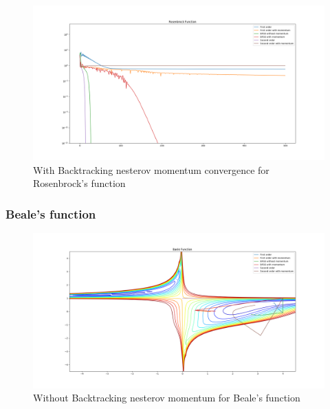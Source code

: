 \documentclass{article}
\begin{document}
\begin{figure}[H]
	\includegraphics[width=\linewidth]{../Images/rosenbrockbacktrack1.png}
	\caption{With Backtracking nesterov momentum convergence for Rosenbrock's function}
	\label{fig:With Backtracking nesterov momentum convergence for Rosenbrock's function}
\end{figure}

\subsubsection{Beale's function}

\begin{figure}[H]
	\includegraphics[width=\linewidth]{../Images/baelenesterov.png}
	\caption{Without Backtracking nesterov momentum for Beale's function}
	\label{fig:Without Backtracking nesterov momentum for Beale's function}
\end{figure}
\end{document}
